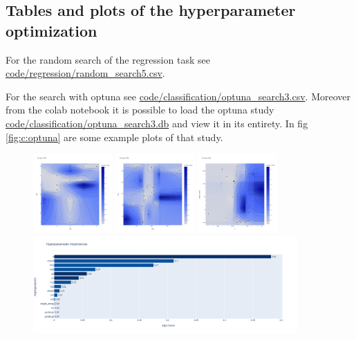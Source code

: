 \documentclass[a4paper, 11pt]{article}
\begin{document}
\newpage
\begin{appendices}
  \section{Tables and plots of the hyperparameter optimization} \label{app:optuna}
    For the random search of the regression task see \url{code/regression/random_search5.csv}.

    For the search with optuna see \url{code/classification/optuna_search3.csv}. Moreover from the colab notebook it is possible to load the optuna study \url{code/classification/optuna_search3.db} and view it in its entirety. In fig \ref{fig:c:optuna}  are some example plots of that study.

    \begin{figure}[H]
      \centering
      \includegraphics[width=0.27\textwidth]{img/classification/o_ch1-ch2.png}
      \includegraphics[width=0.27\textwidth]{img/classification/o_Nh1-Nh2.png}
      \includegraphics[width=0.27\textwidth]{img/classification/o_lr-wd.png}
      \includegraphics[width=0.9\textwidth]{img/classification/o_importance.png}

\end{figure}
\end{appendices}
\end{document}
